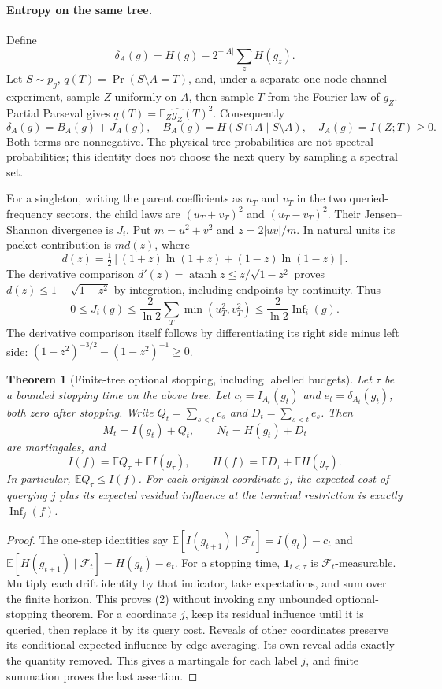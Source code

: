 \documentclass{article}
\newtheorem{theorem}{Theorem}
\begin{document}
\paragraph{Entropy on the same tree.}
Define
\[
 \delta_A(g)=H(g)-2^{-|A|}\sum_zH(g_z).
\]
Let $S\sim p_g$, $q(T)=\Pr(S\setminus A=T)$, and, under a separate
one-node channel experiment, sample $Z$ uniformly on $A$, then sample
$T$ from the Fourier law of $g_Z$. Partial Parseval gives
$q(T)=\mathbb E_Z\widehat {g_Z}(T)^2$. Consequently
\[
 \delta_A(g)=B_A(g)+J_A(g),\quad
 B_A(g)=H(S\cap A\mid S\setminus A),\quad J_A(g)=I(Z;T)\ge0.
\]
Both terms are nonnegative. The physical tree probabilities are not
spectral probabilities; this identity does not choose the next query by
sampling a spectral set.

For a singleton, writing the parent coefficients as $u_T$ and $v_T$ in
the two queried-frequency sectors, the child laws are $(u_T+v_T)^2$ and
$(u_T-v_T)^2$. Their Jensen--Shannon divergence is $J_i$.
Put $m=u^2+v^2$ and $z=2|uv|/m$. In natural units its packet contribution
is $m d(z)$, where
\[
 d(z)=\tfrac12[(1+z)\ln(1+z)+(1-z)\ln(1-z)].
\]
The derivative comparison
$d'(z)=\operatorname{atanh}z\le z/\sqrt{1-z^2}$ proves
$d(z)\le1-\sqrt{1-z^2}$ by integration, including endpoints by
continuity. Thus
\[
 0\le J_i(g)\le\frac{2}{\ln2}\sum_T\min(u_T^2,v_T^2)
 \le\frac{2}{\ln2}\operatorname{Inf}_i(g).                 \tag{1}
\]
The derivative comparison itself follows by differentiating its right
side minus left side: $(1-z^2)^{-3/2}-(1-z^2)^{-1}\ge0$.

\begin{theorem}[Finite-tree optional stopping, including labelled budgets]
Let $\tau$ be a bounded stopping time on the above tree. Let
$c_t=I_{A_t}(g_t)$ and $e_t=\delta_{A_t}(g_t)$, both zero after stopping.
Write $Q_t=\sum_{s<t}c_s$ and $D_t=\sum_{s<t}e_s$. Then
\[
 M_t=I(g_t)+Q_t,\qquad N_t=H(g_t)+D_t
\]
are martingales, and
\[
 I(f)=\mathbb E Q_\tau+\mathbb E I(g_\tau),\qquad
 H(f)=\mathbb E D_\tau+\mathbb E H(g_\tau).                 \tag{2}
\]
In particular, $\mathbb E Q_\tau\le I(f)$.
For each original coordinate $j$, the expected cost of querying $j$ plus
its expected residual influence at the terminal restriction is exactly
$\operatorname{Inf}_j(f)$.
\end{theorem}
\begin{proof}
The one-step identities say
$\mathbb E[I(g_{t+1})\mid\mathcal F_t]=I(g_t)-c_t$ and
$\mathbb E[H(g_{t+1})\mid\mathcal F_t]=H(g_t)-e_t$.
For a stopping time, $\mathbf1_{t<\tau}$ is $\mathcal F_t$-measurable.
Multiply each drift identity by that indicator, take expectations, and
sum over the finite horizon. This proves (2) without invoking any
unbounded optional-stopping theorem.
For a coordinate $j$, keep its residual influence until it is queried,
then replace it by its query cost. Reveals of other coordinates preserve
its conditional expected influence by edge averaging. Its own reveal
adds exactly the quantity removed. This gives a martingale for each
label $j$, and finite summation proves the last assertion.
\end{proof}
\end{document}
